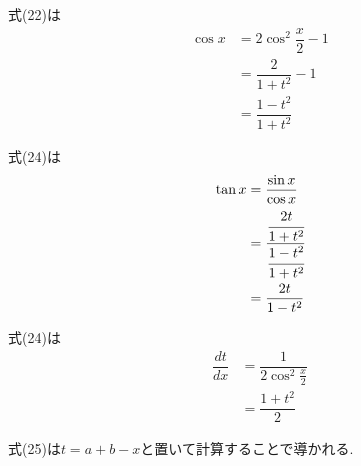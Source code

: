 ﻿\documentclass[dvipdfmx,a4paper,11pt,fleqn]{jsarticle}
\begin{document}
式(22)は
\begin{align*}
  \cos x &= 2\cos^2\dfrac{x}{2}-1\\
  &=\dfrac{2}{1+t^2}-1\\
  &=\dfrac{1-t^2}{1+t^2}
\end{align*}

式(24)は
\begin{align*}
  \tan x &= \frac{\sin x}{\cos x}\\
  &=\cfrac{\cfrac{2t}{1+t^2}}{\cfrac{1-t^2}{1+t^2}}\\
  &=\frac{2t}{1-t^2}
\end{align*}

式(24)は
\begin{align*}
  \dfrac{dt}{dx}&=\dfrac{1}{2\cos^2\frac{x}{2}}\\
  &=\dfrac{1+t^2}{2}
\end{align*}


式(25)は$t=a+b-x$と置いて計算することで導かれる.
\end{document}
